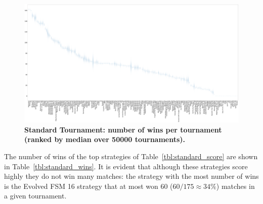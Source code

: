 \documentclass[10pt,letterpaper]{article}
\begin{document}
\begin{landscape}
    \begin{figure}[!hbtp]
        \centering
        \includegraphics[width=\paperwidth]{standard_wins_boxplots.pdf}
        \caption{\bf Standard Tournament: number of wins per tournament (ranked by
        median over
        50000 tournaments).}
        \label{fig:standard_winplot}
    \end{figure}
\end{landscape}

The number of wins of the top strategies of Table~\ref{tbl:standard_score} are
shown in Table~\ref{tbl:standard_wins}. It is evident that although these
strategies score highly they do not win many matches: the strategy with the most
number of wins is the Evolved FSM 16 strategy that at most won 60
(\(60/175\approx34\%\)) matches in a given tournament.
\end{document}
